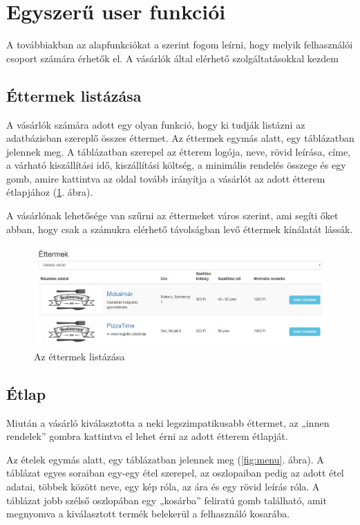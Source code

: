 \section{Egyszerű user funkciói}

A továbbiakban az alapfunkciókat a szerint fogom leírni, hogy melyik felhasználói csoport számára érhetők el. A vásárlók által elérhető szolgáltatásokkal kezdem

\subsection{Éttermek listázása}

A vásárlók számára adott egy olyan funkció, hogy ki tudják listázni az adatbázisban szereplő összes éttermet. Az éttermek egymás alatt, egy táblázatban jelennek meg. A táblázatban szerepel az étterem logója, neve, rövid leírása, címe, a várható kiszállítási idő, kiszállítási költség, a minimális rendelés összege és egy gomb, amire kattintva az oldal tovább irányítja a vásárlót az adott étterem étlapjához (\ref{fig:restaurants}. ábra).

A vásárlónak lehetősége van szűrni az éttermeket város szerint, ami segíti őket abban, hogy csak a számukra elérhető távolságban levő éttermek kínálatát lássák.

\begin{figure}
\centering
\includegraphics[scale=0.5]{kepek/restaurants.png}
\caption{Az éttermek listázása}
\label{fig:restaurants}
\end{figure}

\subsection{Étlap}

Miután a vásárló kiválasztotta a neki legszimpatikusabb éttermet, az „innen rendelek” gombra kattintva el lehet érni az adott étterem étlapját.

Az ételek egymás alatt, egy táblázatban jelennek meg (\ref{fig:menu}. ábra). A táblázat egyes soraiban egy-egy étel szerepel, az oszlopaiban pedig az adott étel adatai, többek között neve, egy kép róla, az ára és egy rövid leírás róla. A táblázat jobb szélső oszlopában egy „kosárba” feliratú gomb található, amit megnyomva a kiválasztott termék belekerül a felhasználó kosarába.

